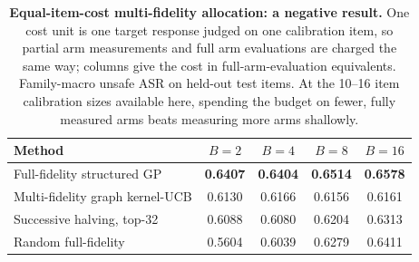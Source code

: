 \begin{table}[t]
\centering
\small
\caption{\textbf{Equal-item-cost multi-fidelity allocation: a negative result.} One cost unit is one
target response judged on one calibration item, so partial arm measurements and full arm evaluations
are charged the same way; columns give the cost in full-arm-evaluation equivalents. Family-macro
unsafe ASR on held-out test items. At the 10--16 item calibration sizes available here, spending the
budget on fewer, fully measured arms beats measuring more arms shallowly.}
\label{tab:confirm_mfid}
\begin{tabular}{lcccc}
\toprule
Method & $B{=}2$ & $B{=}4$ & $B{=}8$ & $B{=}16$ \\
\midrule
Full-fidelity structured GP & \textbf{0.6407} & \textbf{0.6404} & \textbf{0.6514} & \textbf{0.6578} \\
Multi-fidelity graph kernel-UCB & 0.6130 & 0.6166 & 0.6156 & 0.6161 \\
Successive halving, top-32 & 0.6088 & 0.6080 & 0.6204 & 0.6313 \\
Random full-fidelity & 0.5604 & 0.6039 & 0.6279 & 0.6411 \\
\bottomrule
\end{tabular}
\end{table}
